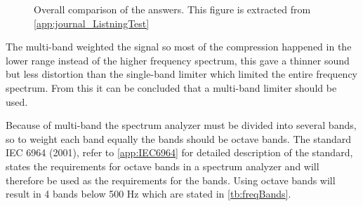 \begin{figure}[H]
\centering
{}
\caption{Overall comparison of the answers. This figure is extracted from \autoref{app:journal_ListningTest}}
\label{fig:piechartsongsReport}
\end{figure}

The multi-band weighted the signal so most of the compression happened in the lower range instead of the higher frequency spectrum, this gave a thinner sound but less distortion than the single-band limiter which limited the entire frequency spectrum. From this it can be concluded that a multi-band limiter should be used. 

Because of multi-band the spectrum analyzer must be divided into several bands, so to weight each band equally the bands should be octave bands. The standard IEC 6964 (2001), refer to \autoref{app:IEC6964} for detailed description of the standard, states the requirements for octave bands in a spectrum analyzer and will therefore be used as the requirements for the bands. Using octave bands will result in 4 bands below 500 Hz which are stated in \autoref{tb:freqBands}.

